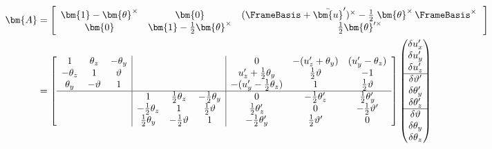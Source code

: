 \begin{equation*}
\begin{aligned}
\bm{A} &= 
\left[\begin{array}{ccc}
\bm{1} - \bm{\theta}^{\times}& \bm{0} & (\FrameBasis+\bar{\bm{u}}^{\prime})^{\times} - \frac{1}{2}\left.\bm{\theta}^{\times}\,\FrameBasis^{\times}\right.\\
\bm{0} & \bm{1} -\frac{1}{2}\bm{\theta}^{\times} & \frac{1}{2}\bm{\theta}^{\prime \times}
\end{array}\right] \\
&=\left[\begin{array}{ccc|ccc|ccc}
1 & \theta_z & -\theta_{\FrameYi} & & & & 0 & -(u_z^{\prime}+\theta_{\FrameYi}) & (u_{\FrameYi}^{\prime} - \theta_z) \\
-\theta_z & 1 & \vartheta &  &  &  &  u_z^{\prime} + \frac{1}{2}\theta_{\FrameYi} & \frac{1}{2}\vartheta & -1 \\
\theta_{\FrameYi} & -\vartheta & 1 & & & & -(u_{\FrameYi}^{\prime} - \frac{1}{2}\theta_z) & 1 & \frac{1}{2}\vartheta \\ \hline
&&& 1 & \frac{1}{2}\theta_z & -\frac{1}{2}\theta_{\FrameYi} & 0 & -\frac{1}{2}\theta_z^{\prime} & \frac{1}{2}\theta_{\FrameYi}^{\prime} \\
& & & -\frac{1}{2}\theta_z & 1 & \frac{1}{2}\vartheta & \frac{1}{2}\theta_z^{\prime} & 0 & -\frac{1}{2} \vartheta^{\prime} \\
& & & \frac{1}{2}\theta_{\FrameYi} & -\frac{1}{2}\vartheta & 1 & -\frac{1}{2}\theta_{\FrameYi}^{\prime} & \frac{1}{2}\vartheta^{\prime} & 0
\end{array}\right]
\begin{pmatrix}
\delta u_x^{\prime} \\
\delta u_{\FrameYi}^{\prime} \\
\delta u_z^{\prime} \\ \hline
\delta \vartheta^{\prime} \\ 
\delta \theta_{\FrameYi}^{\prime} \\
\delta \theta_z^{\prime} \\ \hline
\delta \vartheta \\ 
\delta \theta_{\FrameYi} \\
\delta \theta_z \\
\end{pmatrix}
\end{aligned}
\end{equation*}


